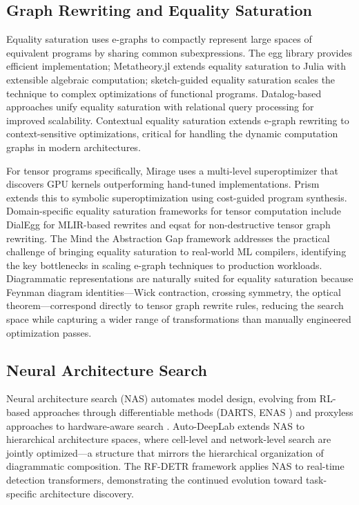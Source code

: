 \documentclass[12pt,a4paper]{article}
\begin{document}
\subsection{Graph Rewriting and Equality Saturation}

Equality saturation \cite{tate2011equality} uses e-graphs to compactly represent large spaces of equivalent programs by sharing common subexpressions. The egg library provides efficient implementation; Metatheory.jl \cite{cheli2021metatheoryjl} extends equality saturation to Julia with extensible algebraic computation; sketch-guided equality saturation \cite{koehler2021sketchguided} scales the technique to complex optimizations of functional programs. Datalog-based approaches \cite{zhang2023better} unify equality saturation with relational query processing for improved scalability. Contextual equality saturation \cite{drewery2025contextuales} extends e-graph rewriting to context-sensitive optimizations, critical for handling the dynamic computation graphs in modern architectures.

For tensor programs specifically, Mirage \cite{wu2024mirage} uses a multi-level superoptimizer that discovers GPU kernels outperforming hand-tuned implementations. Prism \cite{wu2026prism} extends this to symbolic superoptimization using cost-guided program synthesis. Domain-specific equality saturation frameworks for tensor computation include DialEgg \cite{zayed2025dialeggdm} for MLIR-based rewrites and eqsat \cite{merckx2025eqsatae} for non-destructive tensor graph rewriting. The Mind the Abstraction Gap framework \cite{vohra2025mindta} addresses the practical challenge of bringing equality saturation to real-world ML compilers, identifying the key bottlenecks in scaling e-graph techniques to production workloads. Diagrammatic representations are naturally suited for equality saturation because Feynman diagram identities---Wick contraction, crossing symmetry, the optical theorem---correspond directly to tensor graph rewrite rules, reducing the search space while capturing a wider range of transformations than manually engineered optimization passes.

\subsection{Neural Architecture Search}

Neural architecture search (NAS) automates model design, evolving from RL-based approaches \cite{zoph2016neural} through differentiable methods (DARTS, ENAS \cite{pham2018efficientna}) and proxyless approaches \cite{cai2018proxylessnas} to hardware-aware search \cite{elsken2018neural, elsken2019neural}. Auto-DeepLab \cite{liu2019autodeeplab} extends NAS to hierarchical architecture spaces, where cell-level and network-level search are jointly optimized---a structure that mirrors the hierarchical organization of diagrammatic composition. The RF-DETR framework \cite{robinson2025rfdetrna} applies NAS to real-time detection transformers, demonstrating the continued evolution toward task-specific architecture discovery.
\end{document}
